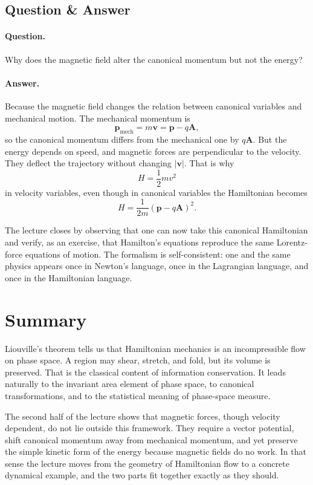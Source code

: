 \subsection{Question \& Answer}

\paragraph{Question.} Why does the magnetic field alter the canonical momentum but not the energy?

\paragraph{Answer.} Because the magnetic field changes the relation between canonical variables and mechanical motion. The mechanical momentum is
\[
\mathbf p_{\mathrm{mech}}=m\mathbf v=\mathbf p-q\mathbf A,
\]
so the canonical momentum differs from the mechanical one by \(q\mathbf A\). But the energy depends on speed, and magnetic forces are perpendicular to the velocity. They deflect the trajectory without changing \(|\mathbf v|\). That is why
\[
H=\frac12 mv^2
\]
in velocity variables, even though in canonical variables the Hamiltonian becomes
\[
H=\frac{1}{2m}(\mathbf p-q\mathbf A)^2.
\]

The lecture closes by observing that one can now take this canonical Hamiltonian and verify, as an exercise, that Hamilton's equations reproduce the same Lorentz-force equations of motion. The formalism is self-consistent: one and the same physics appears once in Newton's language, once in the Lagrangian language, and once in the Hamiltonian language.

\section{Summary}

Liouville's theorem tells us that Hamiltonian mechanics is an incompressible flow on phase space. A region may shear, stretch, and fold, but its volume is preserved. That is the classical content of information conservation. It leads naturally to the invariant area element of phase space, to canonical transformations, and to the statistical meaning of phase-space measure.

The second half of the lecture shows that magnetic forces, though velocity dependent, do not lie outside this framework. They require a vector potential, shift canonical momentum away from mechanical momentum, and yet preserve the simple kinetic form of the energy because magnetic fields do no work. In that sense the lecture moves from the geometry of Hamiltonian flow to a concrete dynamical example, and the two parts fit together exactly as they should.